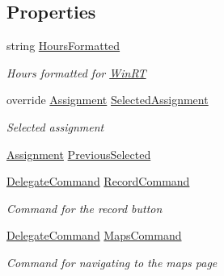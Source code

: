 \subsection*{Properties}
\begin{DoxyCompactItemize}
\item 
string \hyperlink{class_field_service_1_1_win_r_t_1_1_view_models_1_1_assignment_view_model_adad4dbddc44a3cff437aa95c53a247dc}{Hours\+Formatted}
\begin{DoxyCompactList}\small\item\em Hours formatted for \hyperlink{namespace_field_service_1_1_win_r_t}{Win\+R\+T} \end{DoxyCompactList}\item 
override \hyperlink{class_field_service_1_1_data_1_1_assignment}{Assignment} \hyperlink{class_field_service_1_1_win_r_t_1_1_view_models_1_1_assignment_view_model_a7e7c26117f698edeeafd9dca628f759a}{Selected\+Assignment}
\begin{DoxyCompactList}\small\item\em Selected assignment \end{DoxyCompactList}\item 
\hyperlink{class_field_service_1_1_data_1_1_assignment}{Assignment} \hyperlink{class_field_service_1_1_win_r_t_1_1_view_models_1_1_assignment_view_model_a1c3d17006b37704391f20b76796c4347}{Previous\+Selected}
\item 
\hyperlink{class_delegate_command}{Delegate\+Command} \hyperlink{class_field_service_1_1_win_r_t_1_1_view_models_1_1_assignment_view_model_a5bb55f00aab5aa1590c180d2e24a122e}{Record\+Command}
\begin{DoxyCompactList}\small\item\em Command for the record button \end{DoxyCompactList}\item 
\hyperlink{class_delegate_command}{Delegate\+Command} \hyperlink{class_field_service_1_1_win_r_t_1_1_view_models_1_1_assignment_view_model_a45a8f1b9e78f91204dfd267e9fdfaa65}{Maps\+Command}
\begin{DoxyCompactList}\small\item\em Command for navigating to the maps page \end{DoxyCompactList}\item 

\end{DoxyCompactItemize}
